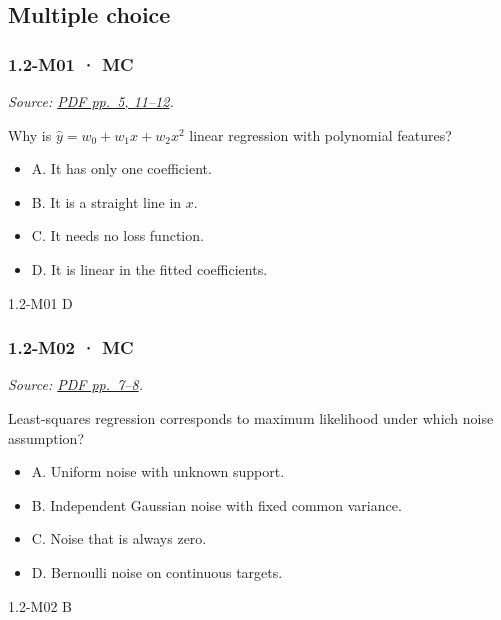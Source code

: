 \subsection{Multiple choice}\label{multiple-choice-1}

\noindent\begin{minipage}{\linewidth}

\subsubsection{1.2-M01 · MC}\label{m01-mc-1}

\emph{Source:
\href{../Lecture\%20Slides/1.2.\%20Shallow\%20Learning.pdf\#page=5}{PDF
pp.~5, 11--12}.}

Why is \(\hat y=w_0+w_1x+w_2x^2\) linear regression with polynomial
features?

\begin{itemize}
\tightlist
\item
  A. It has only one coefficient.
\item
  B. It is a straight line in \(x\).
\item
  C. It needs no loss function.
\item
  D. It is linear in the fitted coefficients.
\end{itemize}

\begin{solution}[8mm]{1.2-M01}
D
\end{solution}
\end{minipage}\par\medskip

\noindent\begin{minipage}{\linewidth}

\subsubsection{1.2-M02 · MC}\label{m02-mc-1}

\emph{Source:
\href{../Lecture\%20Slides/1.2.\%20Shallow\%20Learning.pdf\#page=7}{PDF
pp.~7--8}.}

Least-squares regression corresponds to maximum likelihood under which
noise assumption?

\begin{itemize}
\tightlist
\item
  A. Uniform noise with unknown support.
\item
  B. Independent Gaussian noise with fixed common variance.
\item
  C. Noise that is always zero.
\item
  D. Bernoulli noise on continuous targets.
\end{itemize}

\begin{solution}[8mm]{1.2-M02}
B
\end{solution}
\end{minipage}\par\medskip

